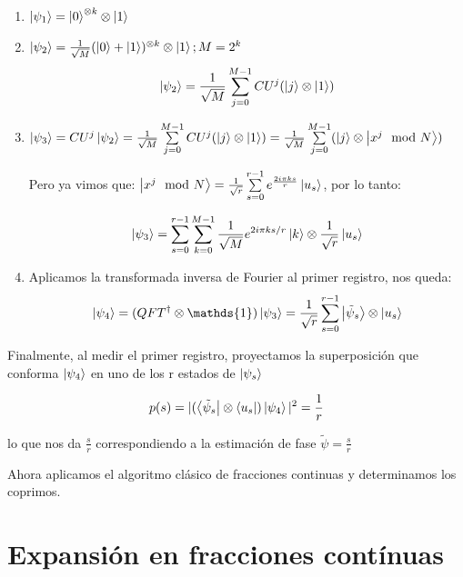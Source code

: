 \begin{enumerate}
    \item $\ket{\psi_1} = \ket{0}^{\otimes k} \otimes \ket{1}$
    \item $\ket{\psi_2} = \frac{1}{\sqrt{M}} (\ket{0} + \ket{1})^{\otimes k} \otimes \ket{1}; M=2^k$
        \begin{equation}
            \ket{\psi_2} = \frac{1}{\sqrt{M}} \sum_{j=0}^{M-1} CU^j (\ket{j} \otimes \ket{1})
        \end{equation}
    \item $\ket{\psi_3} = CU^j \ket{\psi_2} = \frac{1}{\sqrt{M}} \sum\limits_{j=0}^{M-1} CU^j (\ket{j} \otimes \ket{1}) = \frac{1}{\sqrt{M}} \sum\limits_{j=0}^{M-1} (\ket{j} \otimes \ket{x^j \mod N})$

        Pero ya vimos que: $\ket{x^j \mod N} = \frac{1}{\sqrt{r}} \sum\limits_{s=0}^{r-1} e^{\frac{2 i \pi k s}{r}} \ket{u_s}$, por lo tanto:

        \begin{equation}
            \ket{\psi_3} = \sum\limits_{s=0}^{r-1}\sum_{k=0}^{M-1} \frac{1}{\sqrt{M}} e^{2 i \pi k s/r} \ket{k} \otimes \frac{1}{\sqrt{r}} \ket{u_s}
        \end{equation}

    \item Aplicamos la transformada inversa de Fourier al primer registro, nos queda:
        \begin{equation}
            \ket{\psi_4} = (QFT^\dagger \otimes \mathds{1}) \ket{\psi_3} = \frac{1}{\sqrt{r}} \sum\limits_{s=0}^{r-1} \ket{\tilde{\psi}_s} \otimes \ket{u_s}
        \end{equation}
\end{enumerate}

Finalmente, al medir el primer registro, proyectamos la superposición que conforma $\ket{\psi_4}$ en uno de los r estados de $\ket{\psi_s}$

\begin{equation}
    p(s) = |(\bra{\tilde{\psi}_s} \otimes \bra{u_s}) \ket{\psi_4}|^2 = \frac{1}{r}
\end{equation}

lo que nos da $\frac{s}{r}$ correspondiendo a la estimación de fase $\tilde{\psi} = \frac{s}{r}$

Ahora aplicamos el algoritmo clásico de fracciones continuas y determinamos los coprimos.

\section{Expansión en fracciones contínuas}

